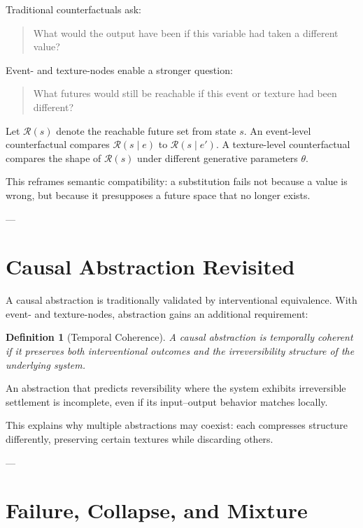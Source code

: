 \documentclass[11pt]{article}
\newtheorem{definition}{Definition}
\begin{document}
Traditional counterfactuals ask:
\begin{quote}
What would the output have been if this variable had taken a different value?
\end{quote}

Event- and texture-nodes enable a stronger question:
\begin{quote}
What futures would still be reachable if this event or texture had been different?
\end{quote}

Let $\mathcal{R}(s)$ denote the reachable future set from state $s$. An event-level counterfactual compares $\mathcal{R}(s \mid e)$ to $\mathcal{R}(s \mid e')$. A texture-level counterfactual compares the shape of $\mathcal{R}(s)$ under different generative parameters $\theta$.

This reframes semantic compatibility: a substitution fails not because a value is wrong, but because it presupposes a future space that no longer exists.

---

\section{Causal Abstraction Revisited}

A causal abstraction is traditionally validated by interventional equivalence. With event- and texture-nodes, abstraction gains an additional requirement:

\begin{definition}[Temporal Coherence]
A causal abstraction is temporally coherent if it preserves both interventional outcomes and the irreversibility structure of the underlying system.
\end{definition}

An abstraction that predicts reversibility where the system exhibits irreversible settlement is incomplete, even if its input–output behavior matches locally.

This explains why multiple abstractions may coexist: each compresses structure differently, preserving certain textures while discarding others.

---

\section{Failure, Collapse, and Mixture}
\end{document}
